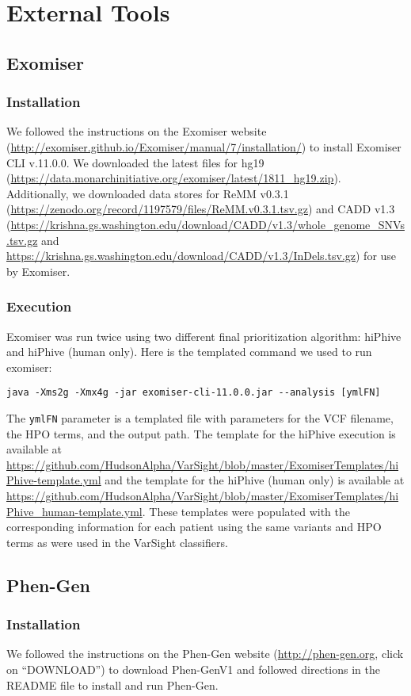\documentclass{article}
\begin{document}
\section{External Tools}
\subsection{Exomiser}
\subsubsection{Installation}
We followed the instructions on the Exomiser website (\url{http://exomiser.github.io/Exomiser/manual/7/installation/}) to install Exomiser CLI v.11.0.0.  We downloaded the latest files for hg19 (\url{https://data.monarchinitiative.org/exomiser/latest/1811_hg19.zip}).  Additionally, we downloaded data stores for ReMM v0.3.1 (\url{https://zenodo.org/record/1197579/files/ReMM.v0.3.1.tsv.gz}) and CADD v1.3 (\url{https://krishna.gs.washington.edu/download/CADD/v1.3/whole_genome_SNVs.tsv.gz} and \url{https://krishna.gs.washington.edu/download/CADD/v1.3/InDels.tsv.gz}) for use by Exomiser. 

\subsubsection{Execution}
Exomiser was run twice using two different final prioritization algorithm: hiPhive and hiPhive (human only).  Here is the templated command we used to run exomiser:
\begin{verbatim}
java -Xms2g -Xmx4g -jar exomiser-cli-11.0.0.jar --analysis [ymlFN]
\end{verbatim}

The \texttt{ymlFN} parameter is a templated file with parameters for the VCF filename, the HPO terms, and the output path.  The template for the hiPhive execution is available at \url{https://github.com/HudsonAlpha/VarSight/blob/master/ExomiserTemplates/hiPhive-template.yml} and the template for the hiPhive (human only) is available at \url{https://github.com/HudsonAlpha/VarSight/blob/master/ExomiserTemplates/hiPhive_human-template.yml}.  These templates were populated with the corresponding information for each patient using the same variants and HPO terms as were used in the VarSight classifiers.

\subsection{Phen-Gen}
\subsubsection{Installation}
We followed the instructions on the Phen-Gen website (\url{http://phen-gen.org}, click on ``DOWNLOAD'') to download Phen-GenV1 and followed directions in the README file to install and run Phen-Gen.  
\end{document}
